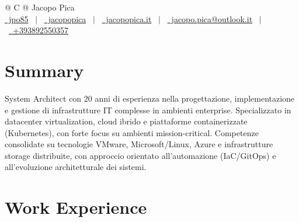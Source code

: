 \documentclass[a4paper,12pt]{article}
\begin{document}
\pagestyle{empty} 



\begin{tabularx}{\linewidth}{@{} C @{}}
\Huge{Jacopo Pica} \\[7.5pt]
\href{https://github.com/jpo85}{\raisebox{-0.05\height}\faGithub\ jpo85} \ $|$ \ 
\href{https://linkedin.com/in/jacopopica}{\raisebox{-0.05\height}\faLinkedin\ jacopopica} \ $|$ \ 
\href{https://notes.jacopopica.it}{\raisebox{-0.05\height}\faGlobe \ jacopopica.it} \ $|$ \ 
\href{mailto:jacopo.pica@outlook.it}{\raisebox{-0.05\height}\faEnvelope \ jacopo.pica@outlook.it} \ $|$ \ 
\href{tel:+393892550357}{\raisebox{-0.05\height}\faMobile \ +393892550357} \\
\end{tabularx}


\section{Summary}
System Architect con 20 anni di esperienza nella progettazione, implementazione e gestione di infrastrutture IT complesse in ambienti enterprise. Specializzato in datacenter virtualization, cloud ibrido e piattaforme containerizzate (Kubernetes), con forte focus su ambienti mission-critical. Competenze consolidate su tecnologie VMware, Microsoft/Linux, Azure e infrastrutture storage distribuite, con approccio orientato all’automazione (IaC/GitOps) e all’evoluzione architetturale dei sistemi.

\section{Work Experience}
\end{document}
